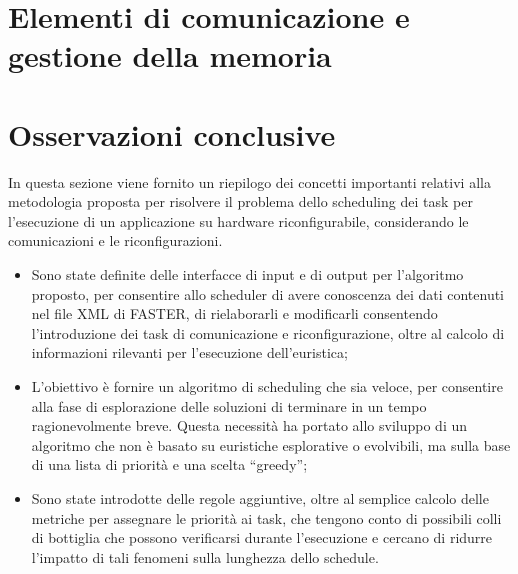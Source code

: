 \section{Elementi di comunicazione e gestione della memoria}
\label{sec:elementiComunicazioneGestioneMemoria}



\section{Osservazioni conclusive}
\label{sec:osservazioniConclusive}
In questa sezione viene fornito un riepilogo dei concetti importanti relativi 
alla metodologia proposta per risolvere il problema dello scheduling dei task 
per l'esecuzione di un applicazione su hardware riconfigurabile, considerando 
le comunicazioni e le riconfigurazioni.

\begin{itemize}
  \item Sono state definite delle interfacce di input e di output per 
l'algoritmo proposto, per consentire allo scheduler di avere conoscenza dei 
dati contenuti nel file XML di \ac{FASTER}, di rielaborarli e modificarli 
consentendo l'introduzione dei task di comunicazione e riconfigurazione, oltre 
al calcolo di informazioni rilevanti per l'esecuzione dell'euristica;
 \item L'obiettivo è fornire un algoritmo di scheduling che sia veloce, per 
consentire alla fase di esplorazione delle soluzioni di terminare in un tempo 
ragionevolmente breve. Questa necessità ha portato allo sviluppo di un algoritmo 
che non è basato su euristiche esplorative o evolvibili, ma sulla base di una 
lista di priorità e una scelta ``greedy'';
 \item Sono state introdotte delle regole aggiuntive, oltre al semplice calcolo 
delle metriche per assegnare le priorità ai task, che tengono conto di 
possibili colli di bottiglia che possono verificarsi durante l'esecuzione e 
cercano di ridurre l'impatto di tali fenomeni sulla lunghezza dello schedule.
\end{itemize}
